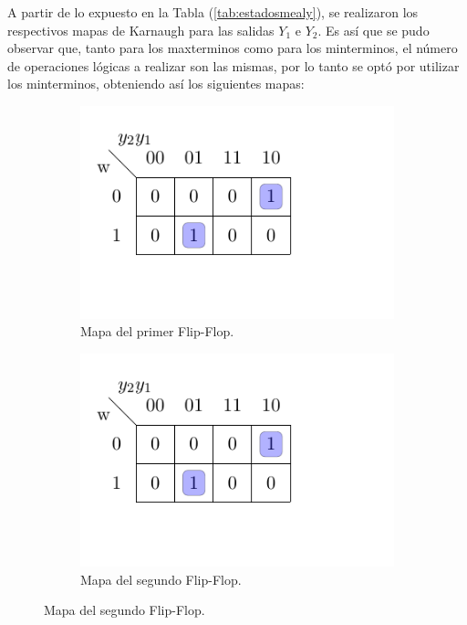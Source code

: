 A partir de lo expuesto en la Tabla (\ref{tab:estadosmealy}), se realizaron los respectivos mapas de Karnaugh para las salidas $Y_1$ e $Y_2$. Es así que se pudo observar que, tanto para los maxterminos como para los minterminos, el número de operaciones lógicas a realizar son las mismas, por lo tanto se optó por utilizar los minterminos, obteniendo así los siguientes mapas:
\begin{figure}[H]
\centering
\begin{subfigure}{0.45\textwidth}
	\centering
	\includegraphics[width=\textwidth, page=1]{ImagenesEjercicio2/Mapas-Kar.pdf}
	\caption{Mapa del primer Flip-Flop.}
\end{subfigure}
\begin{subfigure}{0.45\textwidth}
	\centering
	\includegraphics[width=\textwidth, page=2]{ImagenesEjercicio2/Mapas-Kar.pdf}
	\caption{Mapa del segundo Flip-Flop.}

\end{subfigure}
\end{figure}
